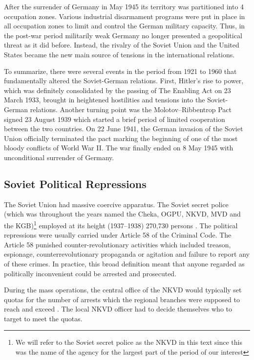 After the surrender of Germany in May 1945 its territory was partitioned into 4 occupation zones.  Various industrial disarmament programs were put in place in all occupation zones to limit and control the German military capacity. Thus, in the post-war period militarily weak Germany no longer presented a geopolitical threat as it did before.
Instead,  the rivalry  of the Soviet Union and the United States became  the new main source of tensions in the international relations. 

To summarize, there were several events in the period from 1921 to 1960 that fundamentally  altered the Soviet-German relations. First,  Hitler's rise to power, which was definitely consolidated by the passing of The Enabling Act on 23 March 1933, brought in heightened hostilities and tensions into the Soviet-German relations.
Another turning point was the Molotov–Ribbentrop Pact signed 23 August 1939 which started a brief period of limited cooperation between the two countries. 
On 22 June 1941, the German invasion of the Soviet Union officially terminated the pact  marking the beginning of one of the most bloody conflicts of World War II. 
 The war finally ended on  8 May 1945  with unconditional surrender of Germany. 
\subsection{Soviet Political Repressions}
The Soviet Union had massive coercive apparatus. The Soviet secret police (which was throughout the years named the Cheka, OGPU, NKVD, MVD and  the KGB)\footnote{We will refer to the Soviet secret police as the NKVD in this text since this was the name of the agency for the largest part of the period of our interest} employed at its height (1937–1938)  270,730 persons \citep[p. 2]{gregory_terror_2009}. 
The political repressions were usually carried under Article 58 of the Criminal Code. The Article 58 punished counter-revolutionary activities 
which included treason, espionage, counterrevolutionary propaganda or agitation and  failure to report any of these crimes.  
In practice, this broad definition meant that anyone regarded as politically inconvenient could be arrested and prosecuted. 

During the mass operations, the central office of the NKVD would typically set quotas for the number of arrests which the regional branches were supposed to reach and exceed \citep[chapter 6]{gregory_terror_2009}. The local NKVD officer had to decide themselves who to target to meet the quotas. 

